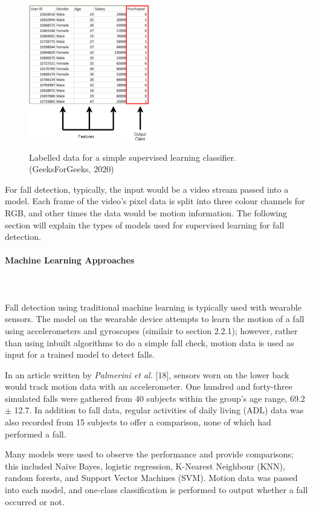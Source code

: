 \begin{figure}[H]
    \centering
    \includegraphics[width=200px,height=250px]{MLdata.png}
    \vspace{1ex}%
    \caption{Labelled data for a simple supervised learning classifier. (GeeksForGeeks, 2020)}
    \label{fig:my_label}
\end{figure}

For fall detection, typically, the input would be a video stream passed into a model. Each frame of the video's pixel data is split into three colour channels for RGB, and other times the data would be motion information. The following section will explain the types of models used for supervised learning for fall detection.

\paragraph{Machine Learning Approaches}\mbox{}\\\\
Fall detection using traditional machine learning is typically used with wearable sensors. The model on the wearable device attempts to learn the motion of a fall using accelerometers and gyroscopes (similair to section 2.2.1); however, rather than using inbuilt algorithms to do a simple fall check, motion data is used as input for a trained model to detect falls. 

In an article written by \textit{Palmerini et al.} [18], sensors worn on the lower back would track motion data with an accelerometer. One hundred and forty-three simulated falls were gathered from 40 subjects within the group's age range, 69.2 $\pm$ 12.7. In addition to fall data, regular activities of daily living (ADL) data was also recorded from 15 subjects to offer a comparison, none of which had performed a fall. 

Many models were used to observe the performance and provide comparisons; this included Naïve Bayes, logistic regression, K-Nearest Neighbour (KNN), random forests, and Support Vector Machines (SVM). Motion data was passed into each model, and one-class classification is performed to output whether a fall occurred or not. 

